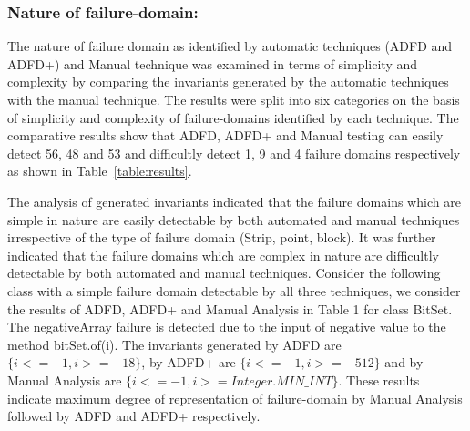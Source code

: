 \subsubsection{Nature of failure-domain:}
The nature of failure domain as identified by automatic techniques (ADFD and ADFD+) and Manual technique was examined in terms of simplicity and complexity by comparing the invariants generated by the automatic techniques with the manual technique. The results were split into six categories on the basis of simplicity and complexity of failure-domains identified by each technique. The comparative results show that ADFD, ADFD+ and Manual testing can easily detect 56, 48 and 53 and difficultly detect 1, 9 and 4 failure domains respectively as shown in Table~\ref{table:results}.

The analysis of generated invariants indicated that the failure domains which are simple in nature are easily detectable by both automated and manual techniques irrespective of the type of failure domain (Strip, point, block). It was further indicated that the failure domains which are complex in nature are difficultly detectable by both automated and manual techniques. %
Consider the following class with a simple failure domain detectable by all three techniques, we consider the results of ADFD, ADFD+ and Manual Analysis in Table 1 for class BitSet. The negativeArray failure is detected due to the input of negative value to the method bitSet.of(i). The invariants generated by ADFD are $\{i <= -1, i >= -18\}$, by ADFD+ are $\{i <= -1, i >= -512\}$ and by Manual Analysis are $\{i <= -1, i >= Integer.MIN\_INT\}$. These results indicate maximum degree of representation of failure-domain by Manual Analysis followed by ADFD and ADFD+ respectively.





